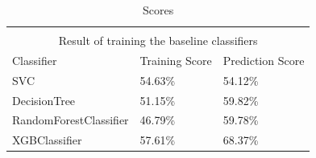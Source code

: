 \setlength{\extrarowheight}{1.5pt}
\begin{table}[!htbp]
\caption{Scores} %
\centering %
\begin{tabular}{|l|l|l|} %
\hline %


\multicolumn{3}{|c|}{}\\
\multicolumn{3}{|c|}{Result of training the baseline classifiers}\\[5pt]
\hline
Classifier & Training Score & Prediction Score\\[0.5ex]
\hline %

SVC     & 54.63\% & 54.12\% \\
DecisionTree       & 51.15\% & 59.82\%\\
RandomForestClassifier   & 46.79\% & 59.78\%\\
XGBClassifier            & 57.61\% & 68.37\%\\

\hline%
\end{tabular}
\label{tableBenchMarkScores}{}
\end{table}

